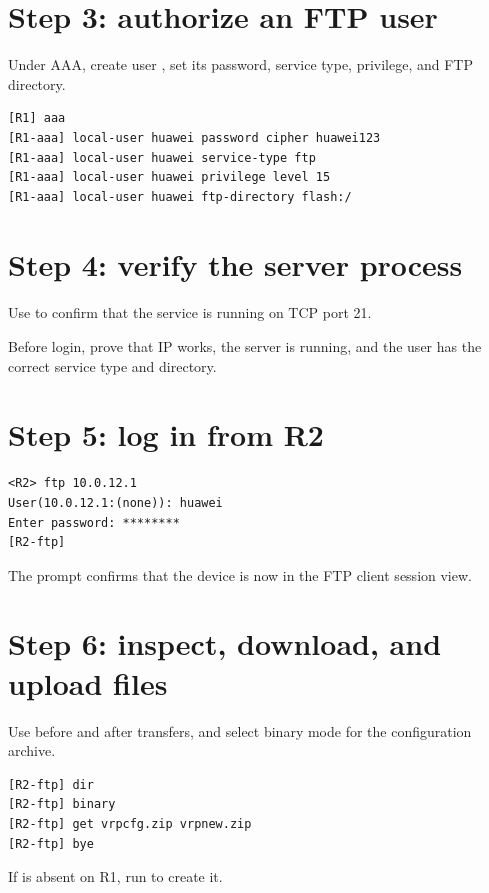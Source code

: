 \section{Step 3: authorize an FTP user}
Under AAA, create user , set its password, service type, privilege, and FTP directory.
\begin{lstlisting}[style=dcnterminal]
[R1] aaa
[R1-aaa] local-user huawei password cipher huawei123
[R1-aaa] local-user huawei service-type ftp
[R1-aaa] local-user huawei privilege level 15
[R1-aaa] local-user huawei ftp-directory flash:/
\end{lstlisting}

\section{Step 4: verify the server process}
Use  to confirm that the service is running on TCP port 21.


\begin{verifybox}
Before login, prove that IP works, the server is running, and the user has the correct service type and directory.
\end{verifybox}

\section{Step 5: log in from R2}
\begin{lstlisting}[style=dcnterminal]
<R2> ftp 10.0.12.1
User(10.0.12.1:(none)): huawei
Enter password: ********
[R2-ftp]
\end{lstlisting}


The \cmd{[R2-ftp]} prompt confirms that the device is now in the FTP client session view.

\section{Step 6: inspect, download, and upload files}
Use  before and after transfers, and select binary mode for the configuration archive.
\begin{lstlisting}[style=dcnterminal]
[R2-ftp] dir
[R2-ftp] binary
[R2-ftp] get vrpcfg.zip vrpnew.zip
[R2-ftp] bye
\end{lstlisting}
If  is absent on R1, run  to create it.

